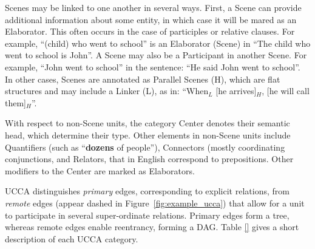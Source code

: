 \documentclass[11pt,a4paper]{article}
\begin{document}
  Scenes may be linked to one another in several ways. First, a Scene can provide additional information about some entity,
  in which case it will be mared as an Elaborator. This often occurs in the case of participles or relative clauses.
  For example, ``(child) who went to school'' is an Elaborator (Scene)
  in ``The child who went to school is John''.
  A Scene may also be a Participant in another Scene. For example, ``John went to school'' in the sentence: ``He said John went to school''. 
  In other cases, Scenes are annotated as Parallel Scenes (H), which are flat structures and may include a Linker (L), 
  as in:  ``When$_L$ [he arrives]$_H$, [he will call them]$_H$''.

  With respect to non-Scene units, the category Center denotes their semantic head, which determine their type. 
  Other elements in non-Scene units include Quantifiers (such as ``{\bf dozens} of people''), Connectors (mostly
  coordinating conjunctions, and Relators, that in English correspond to prepositions.
  Other modifiers to the Center are marked as Elaborators.
  
  UCCA distinguishes \textit{primary} edges, corresponding 
  to explicit relations, from \textit{remote} edges (appear dashed in
  Figure~\ref{fig:example_ucca}) that allow for a unit to participate
  in several super-ordinate relations.
  Primary edges form a tree, whereas remote edges enable reentrancy, forming a DAG.
  Table \ref{} gives a short description of each UCCA category.




  

  
  
\end{document}
